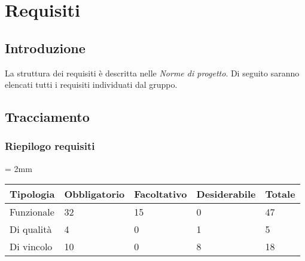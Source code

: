 \section{Requisiti}

    \subsection{Introduzione}
    La struttura dei requisiti è descritta nelle \emph{Norme di progetto}. Di seguito saranno elencati tutti i requisiti individuati dal gruppo. 
    
    
    
    
    
    
    \subsection{Tracciamento}
    
    
    \subsubsection{Riepilogo requisiti}
    
    \tabulinesep = 2mm %
    \begin{longtabu} to \textwidth {| X | X | X | X | X |} %
    \hline
        
    \textbf{Tipologia} & \textbf{Obbligatorio} & \textbf{Facoltativo} & \textbf{Desiderabile} & \textbf{Totale} \\
    \hline
    Funzionale & 32 & 15 & 0 & 47\\
    \hline
    Di qualità & 4 & 0 & 1 & 5\\
    \hline
    Di vincolo & 10 & 0 & 8 & 18\\
    \hline
    
    \end{longtabu}
